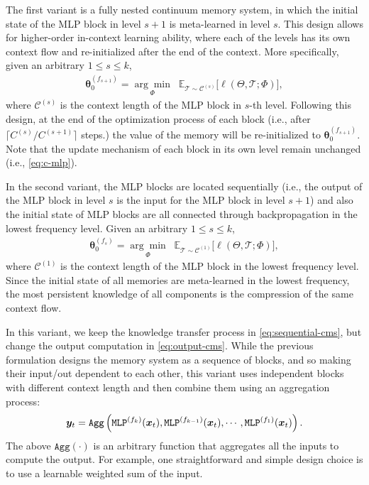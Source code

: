 {
The first variant is a fully nested continuum memory system, in which the initial state of the MLP block in level $s+1$ is meta-learned in level $s$. This design allows for higher-order in-context learning ability, where each of the levels has its own context flow and re-initialized after the end of the context. More specifically, given an arbitrary $1 \leq s \leq k$, 
\begin{align}
    \boldsymbol{\theta}^{(f_{s+1})}_0 =
\underset{\Phi}{\arg\min}
\;\;
\mathbb{E}_{\mathcal{T} \sim \mathcal{C}^{(s)}}
\Biggl[
    \ell(\Theta, \mathcal{T}; \Phi)
\Biggr],
\end{align}
where $\mathcal{C}^{(s)}$ is the context length of the MLP block in $s$-th level. Following this design, at the end of the optimization process of each block (i.e., after $\lceil C^{(s)}/C^{(s+1)} \rceil$ steps.) the value of the memory will be re-initialized to $ \boldsymbol{\theta}^{(f_{s+1})}_0$. Note that the update mechanism of each block in its own level remain unchanged (i.e., \autoref{eq:c-mlp}).

In the second variant, the MLP blocks are located sequentially (i.e., the output of the MLP block in level $s$ is the input for the MLP block in level $s+1$) and also the initial state of MLP blocks are all connected through backpropagation in the lowest frequency level. Given an arbitrary $1 \leq s \leq k$, 
\begin{align}\label{eq:sequential-cms}
    \boldsymbol{\theta}^{(f_{s})}_0 =
\underset{\Phi}{\arg\min}
\;\;
\mathbb{E}_{\mathcal{T} \sim \mathcal{C}^{(1)}}
\Biggl[
    \ell(\Theta, \mathcal{T}; \Phi)
\Biggr],
\end{align}
where $\mathcal{C}^{(1)}$ is the context length of the MLP block in the lowest frequency level. Since the initial state of all memories are meta-learned in the lowest frequency, the most persistent knowledge of all components is the compression of the same context flow. 




In this variant, we keep the knowledge transfer process in \autoref{eq:sequential-cms}, but change the output computation in \autoref{eq:output-cms}. While the previous formulation designs the memory system as a sequence of blocks, and so making their input/out dependent to each other, this variant uses independent blocks with different context length and then combine them using an aggregation process:
\begin{align}\label{eq:independent-variant}
    \boldsymbol{y}_t = \texttt{Agg} \left(\texttt{MLP}^{(f_k)}(\boldsymbol{x}_t), \texttt{MLP}^{(f_{k-1})}(\boldsymbol{x}_t), \cdots, \texttt{MLP}^{(f_1)}(\boldsymbol{x}_t) \right).
\end{align}
The above $\texttt{Agg} \left(\cdot\right)$ is an arbitrary function that aggregates all the inputs to compute the output. For example, one straightforward and simple design choice is to use a learnable weighted sum of the input. 






}
